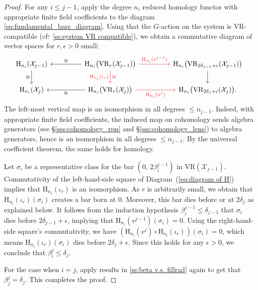 \documentclass{amsart}
\theoremstyle{definition}
\newcommand{\rH}{\mathrm{H}}
\newcommand{\cX}{\mathcal{X}}
\newcommand{\VR}{\mathrm{VR}}
\theoremstyle{theorem}
\providecommand{\DIFdeltex}[1]{{\protect\color{red}\sout{#1}}}                      %
\providecommand{\DIFdelbegin}{} %
\providecommand{\DIFdelend}{} %
\providecommand{\DIFdel}[1]{\texorpdfstring{\DIFdeltex{#1}}{}} %
\newcommand{\DIFscaledelfig}{0.5}
\newlength{\DIFdelgraphicswidth} %
\newlength{\DIFdelgraphicsheight} %
\newcommand{\DIFdelincludegraphics}[2][]{%
\sbox{\DIFdelgraphicsbox}{\DIFOincludegraphics[#1]{#2}}%
\settoboxwidth{\DIFdelgraphicswidth}{\DIFdelgraphicsbox} %
\settoboxtotalheight{\DIFdelgraphicsheight}{\DIFdelgraphicsbox} %
\scalebox{\DIFscaledelfig}{%
\parbox[b]{\DIFdelgraphicswidth}{\usebox{\DIFdelgraphicsbox}\\[-\baselineskip] \rule{\DIFdelgraphicswidth}{0em}}\llap{\resizebox{\DIFdelgraphicswidth}{\DIFdelgraphicsheight}{%
\setlength{\unitlength}{\DIFdelgraphicswidth}%
\begin{picture}(1,1)%
\thicklines\linethickness{2pt} %
{\color[rgb]{1,0,0}\put(0,0){\framebox(1,1){}}}%
{\color[rgb]{1,0,0}\put(0,0){\line( 1,1){1}}}%
{\color[rgb]{1,0,0}\put(0,1){\line(1,-1){1}}}%
\end{picture}%
}\hspace*{3pt}}} %
} %
\DeclareRobustCommand{\DIFdelbegin}{\DIFOdelbegin \let\includegraphics\DIFdelincludegraphics} %
\DeclareRobustCommand{\DIFdelend}{\DIFOaddend \let\includegraphics\DIFOincludegraphics} %
\renewcommand{\DIFdel}[1]{{\color{deletedpurple}\ifmmode\oldmath{#1}\else\sout{#1}\fi}}
\newcommand{\oldmath}[1]{{\color{deletedpurple}\mathpalette\horizontalstrike{#1}}}
\newcommand{\horizontalstrike}[2]{\sbox0{$#1#2$}\rlap{\raisebox{.5\ht0}{\rule{\wd0}{.4pt}}}\usebox0}
\begin{document}
\begin{proof}
	For any \(i \leq j - 1\), apply the degree \(n_i\) reduced homology functor with appropriate finite field coefficients to the diagram \eqref{eq:fundamental_bars_diagram}.
	Using that the \(G\)-action on the system is \(\VR\)-compatible (cf\DIFdelbegin \DIFdel{.}\DIFdelend ~\cref{ss:system VR compatible}), we obtain a commutative diagram of vector spaces for $r,\epsilon > 0$ small:
	\begin{equation}\label{eq:diagram of H}
		\begin{tikzcd}[column sep = 4.5em]
			\rH_{n_i}(\cX_{j-1})
			\ar[d, "\cong" left]
			&
			\rH_{n_i}\big(\VR_r(\cX_{j-1})\big)
			\ar[d, "\rH_{n_i}(\iota_r)" left, "\cong" right, myred]
			\ar[l, "\cong" above]
			\ar[r, "\rH_{n_i}(v^{{j-1}})", myred]
			&
			\rH_{n_i}\big(\VR_{2\delta_{j-1}+\epsilon}(\cX_{j-1})\big)
			\ar[d]
			\\
			\rH_{n_i}(\cX_j)
			&
			\rH_{n_i}\big(\VR_r(\cX_j)\big)
			\ar[l, "\cong"]
			\ar[r, "\rH_{n_i}(v^j)" below, myred]
			&
			\rH_{n_i}\big(\VR_{2\delta_j+\epsilon}(\cX_j)\big).
		\end{tikzcd}
	\end{equation}
	The left-most vertical map is an isomorphism in all degrees $\le n_{j-1}$.
	Indeed, with appropriate finite field coefficients, the induced map on cohomology sends algebra generators (see \S\ref{sss:cohomology_rpn} and \S\ref{sss:cohomology_lens}) to algebra generators, hence is an isomorphism in all degrees $\le n_{j-1}$.
	By the universal coefficient theorem, the same holds for homology.

	Let $\sigma_i$ be a representative class for the bar $(0,\, 2\beta_{i}^{j-1})$ in $\VR(\cX_{j-1})$.
	Commutativity of the left-hand-side square of Diagram~(\ref{eq:diagram of H}) implies that $\rH_{n_i}(\iota_r)$ is an isomorphism.
	As $r$ is arbitrarily small, we obtain that $\rH_{n_i}(\iota_r)(\sigma_i)$ creates a bar born at $0$.
	Moreover, this bar dies before or at $2\delta_j$ as explained below.
	It follows from the induction hypothesis $\beta_i^{j-1} \leq \delta_{j-1}$ that $\sigma_i$ dies before $2\delta_{j-1} + \epsilon$, implying that $\rH_{n_i}(v^{{j-1}})(\sigma_i) = 0$.
	Using the right-hand-side square's commutativity, we have $(\rH_{n_i}(v^j) \circ \rH_{n_i}(\iota_r))(\sigma_i)=0$, which means $\rH_{n_i}(\iota_r)(\sigma_i)$ dies before $2\delta_j+\epsilon$.
	Since this holds for any \(\epsilon > 0\), we conclude that \(\beta_i^j \leq \delta_j\).

	For the case when $i = j$, apply results in \cref{ss:beta v.s. fillrad} again to get that $\beta_j^j = \delta_j$.
	This completes the proof.
\end{proof}
\end{document}
